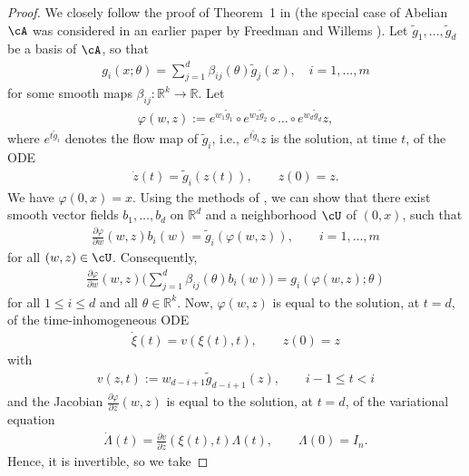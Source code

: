 \documentclass[letterpaper, 10pt, conference]{ieeeconf}
\def\Reals{{\mathbb R}}
\def\deq{:=}
\begin{document}
\begin{proof} We closely follow the proof of Theorem~1 in \cite{krener1981complexity} (the special case of Abelian $\cA$ was considered in an earlier paper by Freedman and Willems \cite{freedman1978smooth}). Let $\tilde{g}_1,\ldots,\tilde{g}_d$ be a basis of $\cA$, so that
	\begin{align}\label{eq:g_i_expanded}
		g_i(x;\theta) = \sum^d_{j=1} \beta_{ij}(\theta) \tilde{g}_j(x), \quad i = 1,\dots,m
	\end{align}
	for some smooth maps $\beta_{ij} : \Reals^k \to \Reals$. Let
	\begin{align*}
		\varphi(w,z) \deq e^{w_1 \tilde{g}_1} \circ e^{w_2 \tilde{g}_2} \circ \dots \circ e^{w_d \tilde{g}_d}z,
	\end{align*}
	where $e^{t \tilde{g}_i}$ denotes the flow map of $\tilde{g}_i$, i.e., $e^{t\tilde{g}_i}z$ is the solution, at time $t$, of the ODE
	\begin{align*}
		\dot{z}(t) = \tilde{g}_i(z(t)), \qquad z(0) = z.
	\end{align*}
We have $\varphi(0,x) = x$. Using the methods of \cite{krener1981complexity}, we can show that there exist smooth vector fields $b_1,\dots,b_d$ on $\Reals^d$ and a neighborhood $\cU$ of $(0,x)$, such that
\begin{align*}
	\frac{\partial \varphi}{\partial w}(w,z) b_i(w) = \tilde{g}_i(\varphi(w,z)), \qquad i = 1,\dots,m
\end{align*}
for all $(w,z) \in \cU$. Consequently,
\begin{align*}
\frac{\partial \varphi}{\partial w}(w,z) \bigg(\sum^d_{j=1}\beta_{ij}(\theta)b_i(w)\bigg) = g_i(\varphi(w,z); \theta)
\end{align*}
for all $1 \le i \le d$ and all $\theta \in \Reals^k$. Now, $\varphi(w,z)$ is equal to the solution, at $t = d$, of the time-inhomogeneous ODE
\begin{align*}
	\dot{\xi}(t) = v(\xi(t),t), \qquad z(0) = z
\end{align*}
with
\begin{align*}
	v(z,t) \deq w_{d-i+1} \tilde{g}_{d-i+1}(z), \qquad i-1 \le t < i
\end{align*}
and the Jacobian $\frac{\partial \varphi}{\partial z}(w,z)$ is equal to the solution, at $t=d$, of the variational equation
\begin{align*}
	\dot{\Lambda}(t) = \frac{\partial v}{\partial z}(\xi(t),t)\Lambda(t), \qquad \Lambda(0) = I_n.
\end{align*}
Hence, it is invertible, so we take

\end{proof}
\end{document}
